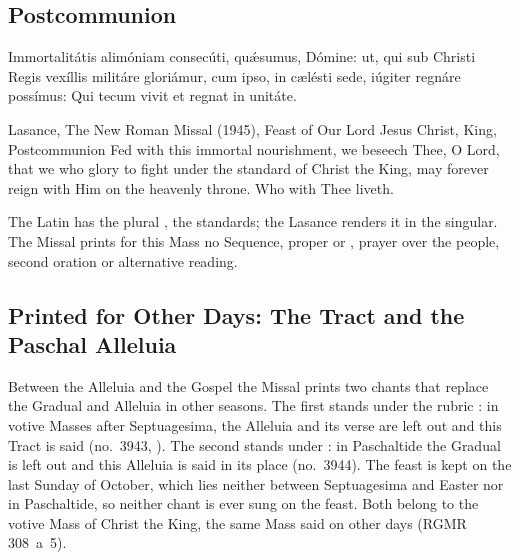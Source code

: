 \subsection{Postcommunion}
\label{proper-postcommunion}


\begin{latinproper}
Immortalitátis alimóniam consecúti, quǽsumus, Dómine: ut, qui sub Christi
Regis vexíllis militáre gloriámur, cum ipso, in cælésti sede, iúgiter regnáre
possímus: Qui tecum vivit et regnat in unitáte.
\end{latinproper}

\begin{englishwitness}{Lasance, The New Roman Missal (1945), Feast of Our Lord Jesus Christ, King, Postcommunion}
Fed with this immortal nourishment, we beseech Thee, O Lord, that we who glory
to fight under the standard of Christ the King, may forever reign with Him on
the heavenly throne. Who with Thee liveth.
\end{englishwitness}

\noindent The Latin has the plural , the standards; the
Lasance renders it in the singular. The Missal prints for this Mass no Sequence, proper
 or , prayer over the people, second
oration or alternative reading.

\subsection{Printed for Other Days: The Tract and the Paschal Alleluia}
\label{sec:other-days}

Between the Alleluia and the Gospel the Missal prints two chants that replace
the Gradual and Alleluia in other seasons. The first stands under the rubric
: in votive Masses after Septuagesima, the Alleluia and its
verse are left out and this Tract is said (no.~3943, ). The second stands under : in Paschaltide the Gradual is left out and
this Alleluia is said in its place (no.~3944). The feast is kept on the last
Sunday of October, which lies neither between Septuagesima and Easter nor in
Paschaltide, so neither chant is ever sung on the feast. Both belong to the
votive Mass of Christ the King, the same Mass said on other days (RGMR
308~a~5).

